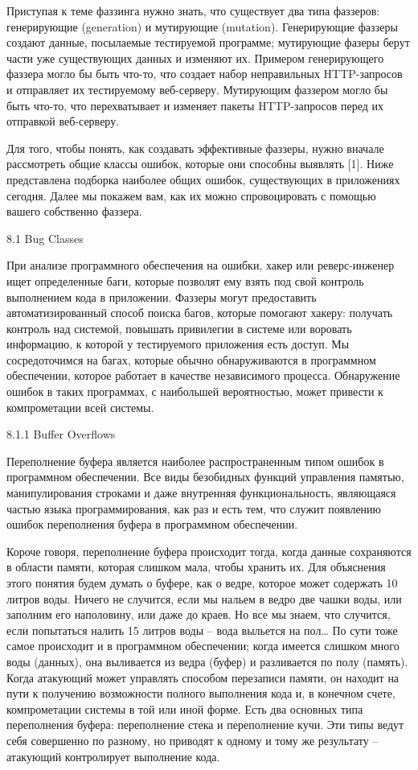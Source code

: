 \documentclass[12pt, a4paper, oneside]{book}
\begin{document}
Приступая к теме фаззинга нужно знать, что существует два типа фаззеров: генерирующие (generation) и мутирующие (mutation). Генерирующие фаззеры создают данные, посылаемые тестируемой программе; мутирующие фазеры берут части уже существующих данных и изменяют их. Примером генерирующего фаззера могло бы быть что-то, что создает набор неправильных HTTP-запросов и отправляет их тестируемому веб-серверу. Мутирующим фаззером могло бы быть что-то, что перехватывает и изменяет пакеты HTTP-запросов перед их отправкой веб-серверу. 

Для того, чтобы понять, как создавать эффективные фаззеры, нужно вначале рассмотреть общие классы ошибок, которые они способны выявлять [1]. Ниже представлена подборка наиболее общих ошибок, существующих в приложениях сегодня. Далее мы покажем вам, как их можно спровоцировать с помощью вашего собственно фаззера. 


8.1 Bug Classes

При анализе программного обеспечения на ошибки, хакер или реверс-инженер ищет определенные баги, которые позволят ему взять под свой контроль выполнением кода в приложении. Фаззеры могут предоставить автоматизированный способ поиска багов, которые помогают хакеру: получать контроль над системой, повышать привилегии в системе или воровать информацию, к которой у тестируемого приложения есть доступ. Мы сосредоточимся на багах, которые обычно обнаруживаются в программном обеспечении, которое работает в качестве независимого процесса. Обнаружение ошибок в таких программах, с наибольшей вероятностью, может привести к компрометации всей системы. 

8.1.1 Buffer Overflows

Переполнение буфера является наиболее распространенным типом ошибок в программном обеспечении. Все виды безобидных функций управления памятью, манипулирования строками и даже внутренняя функциональность, являющаяся частью языка программирования, как раз и есть тем, что служит появлению ошибок переполнения буфера в программном обеспечении.

Короче говоря, переполнение буфера происходит тогда, когда данные сохраняются в области памяти, которая слишком мала, чтобы хранить их. Для объяснения этого понятия будем думать о буфере, как о ведре, которое может содержать 10 литров воды. Ничего не случится, если мы нальем в ведро две чашки воды, или заполним его наполовину, или даже до краев. Но все мы знаем, что случится, если попытаться налить 15 литров воды – вода выльется на пол… По сути тоже самое происходит и в программном обеспечении; когда имеется слишком много воды (данных), она выливается из ведра (буфер) и разливается по полу (память). Когда атакующий может управлять способом перезаписи памяти, он находит на пути к получению возможности полного выполнения кода и, в конечном счете, компрометации системы в той или иной форме. Есть два основных типа переполнения буфера: переполнение стека и переполнение кучи. Эти типы ведут себя совершенно по разному, но приводят к одному и тому же результату – атакующий контролирует выполнение кода.
\end{document}
